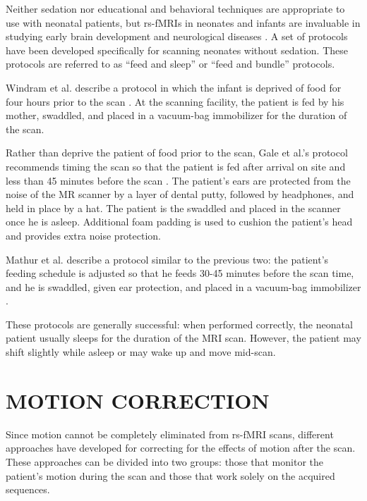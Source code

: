 Neither sedation nor educational and behavioral techniques are appropriate to use with neonatal patients, but rs-fMRIs in neonates and infants are invaluable  in studying early brain development and neurological diseases \cite{Smyser2015}. A set of protocols have been developed specifically for scanning neonates without sedation. These protocols are referred to as ``feed and sleep'' or ``feed and bundle'' protocols.

Windram et al. describe a protocol in which the infant is deprived of food for four hours prior to the scan \cite{Windram2011}. At the scanning facility, the patient is fed by his mother, swaddled, and placed in a vacuum-bag immobilizer for the duration of the scan. 

Rather than deprive the patient of food prior to the scan, Gale et al.'s protocol recommends timing the scan so that the patient is fed after arrival on site and less than 45 minutes before the scan \cite{Gale2013}. The patient's ears are protected from the noise of the MR scanner by a layer of dental putty, followed by headphones, and held in place by a hat. The patient is the swaddled and placed in the scanner once he is asleep. Additional foam padding is used to cushion the patient's head and provides extra noise protection.

Mathur et al. describe a protocol similar to the previous two: the patient's feeding schedule is adjusted so that he feeds 30-45 minutes before the scan time, and he is swaddled, given ear protection, and placed in a vacuum-bag immobilizer \cite{Mathur2008}.

These protocols are generally successful: when performed correctly, the neonatal patient usually sleeps for the duration of the MRI scan. However, the patient may shift slightly while asleep or may wake up and move mid-scan.


\section{MOTION CORRECTION}

Since motion cannot be completely eliminated from rs-fMRI scans, different approaches have developed for correcting for the effects of motion after the scan. These approaches can be divided into two groups: those that monitor the patient's motion during the scan and those that work solely on the acquired sequences.

